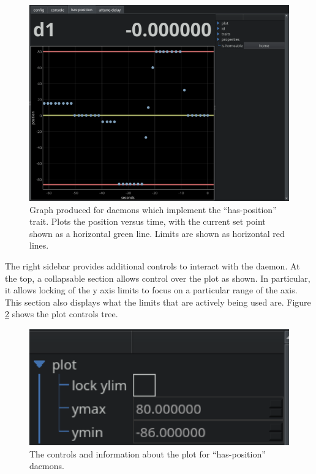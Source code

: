 \begin{landscape}
\begin{figure}
\includegraphics[width=8in]{"yaq/images/has_position_graph"}
\caption[\yaqcqtpy{} has-position Graph]{
	Graph produced for daemons which implement the 	``has-position'' trait.
	Plots the position versus time, with the current set point shown as a horizontal green line.
	Limits are shown as horizontal red lines.
}
\label{yaq:fig:has_position_graph}
\end{figure}
\end{landscape}


The right sidebar provides additional controls to interact with the daemon.
At the top, a collapsable section allows control over the plot as shown.
In particular, it allows locking of the y axis limits to focus on a particular range of the axis.
This section also displays what the limits that are actively being used are.
Figure \ref{yaq:fig:has_position_plot_controls} shows the plot controls tree.

\begin{figure}
\includegraphics[width=4.5in]{"yaq/images/has_position_plot_controls"}
\caption[\yaqcqtpy{} has-position Plot Controls]{
	The controls and information about the plot for ``has-position'' daemons.
}
\label{yaq:fig:has_position_plot_controls}
\end{figure}


